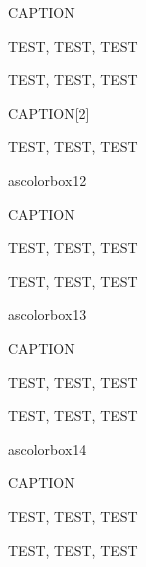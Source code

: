 \begin{ascolorbox11}{CAPTION}

TEST, TEST, TEST

\end{ascolorbox11}

\begin{ascolorbox11}{}

TEST, TEST, TEST

\end{ascolorbox11}

\begin{ascolorbox11}{CAPTION}[2]

TEST, TEST, TEST

\end{ascolorbox11}

ascolorbox12

\begin{ascolorbox12}{CAPTION}

TEST, TEST, TEST

\end{ascolorbox12}

\begin{ascolorbox12}{}

TEST, TEST, TEST

\end{ascolorbox12}

ascolorbox13

\begin{ascolorbox13}{CAPTION}

TEST, TEST, TEST

\end{ascolorbox13}

\begin{ascolorbox13}{}

TEST, TEST, TEST

\end{ascolorbox13}

ascolorbox14

\begin{ascolorbox14}{CAPTION}

TEST, TEST, TEST

\end{ascolorbox14}

\begin{ascolorbox14}{}

TEST, TEST, TEST

\end{ascolorbox14}

